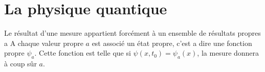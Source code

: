 \documentclass{article}
\begin{document}
\section{La physique quantique}
Le résultat d'une mesure appartient forcément à un ensemble de résultats propres {a}
A chaque valeur propre $a$ est associé un état propre, c'est a dire une fonction propre
$\psi_a$.
Cette fonction est telle que si $\psi(x, t_0)=\psi_a(x)$, la mesure donnera à coup sûr $a$.
\end{document}
